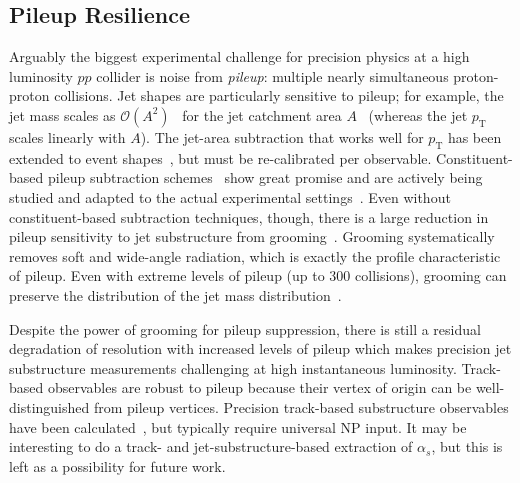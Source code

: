 \documentclass[11pt]{cernrep}
\begin{document}
%
%
%


\subsection{Pileup Resilience}

Arguably the biggest experimental challenge for precision physics at a high luminosity $pp$ collider is noise from \textit{pileup}: multiple nearly simultaneous proton-proton collisions.
%
Jet shapes are particularly sensitive to pileup; for example, the jet mass scales as $\mathcal{O}(A^2)$~\cite{Salam:2009jx} for the jet catchment area $A$~\cite{Cacciari:2008gn} (whereas the jet $p_\mathrm{T}$ scales linearly with $A$).
%
The jet-area subtraction that works well for $p_\mathrm{T}$ has been extended to event shapes~\cite{Soyez:2012hv}, but must be re-calibrated per observable.
%
Constituent-based pileup subtraction schemes~\cite{Cacciari:2014gra,Krohn:2013lba,Bertolini:2014bba,Berta:2014eza,Komiske:2017ubm} show great promise and are actively being studied and adapted to the actual experimental settings~\cite{CMS-PAS-JME-14-001,CMS-DP-2015-034,ATLAS-CONF-2017-065,ATL-PHYS-PUB-2017-020,Aad:2015ina}.
%
Even without constituent-based subtraction techniques, though, there is a large reduction in pileup sensitivity to jet substructure from grooming~\cite{CMS-PAS-JME-14-001,Aad:2015rpa,Aad:2015ina,Altheimer:2013yza}.
%
Grooming systematically removes soft and wide-angle radiation, which is exactly the profile characteristic of pileup.
%
Even with extreme levels of pileup (up to 300 collisions), grooming can preserve the distribution of the jet mass distribution~\cite{JetSubstructureECFA2014}. 

Despite the power of grooming for pileup suppression, there is still a residual degradation of resolution with increased levels of pileup which makes precision jet substructure measurements challenging at high instantaneous luminosity.
%
Track-based observables are robust to pileup because their vertex of origin can be well-distinguished from pileup vertices.
%
Precision track-based substructure observables have been calculated~\cite{Krohn:2012fg,Waalewijn:2012sv,Chang:2013rca,Elder:2017bkd}, but typically require universal NP input.
%
It may be interesting to do a track- and jet-substructure-based extraction of $\alpha_s$, but this is left as a possibility for future work.
\end{document}
